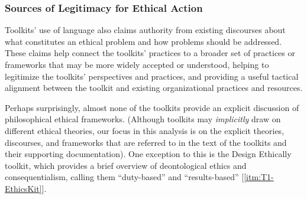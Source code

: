 \documentclass[acmsmall]{acmart}
\begin{document}
\subsubsection{Sources of Legitimacy for Ethical Action} %
Toolkits' use of language also claims authority from existing discourses about what constitutes an ethical problem and how problems should be addressed. These claims help connect the toolkits’ practices to a broader set of practices or frameworks that may be more widely accepted or understood, helping to legitimize the toolkits’ perspectives and practices, and
providing a useful tactical alignment between the toolkit and existing organizational practices and resources.

Perhaps surprisingly, almost none of the toolkits provide an explicit discussion of philosophical ethical frameworks. (Although toolkits may \textit{implicitly} draw on different ethical theories, our focus in this analysis is on the explicit theories, discourses, and frameworks that are referred to in the text of the toolkits and their supporting documentation). One exception to this is the Design Ethically toolkit, which provides a brief overview of deontological ethics and consequentialism, calling them ``duty-based'' and ``results-based'' [\ref{itm:T1-EthicsKit}]. %
\end{document}
